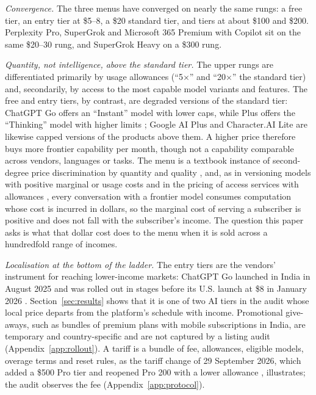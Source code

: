 \documentclass[11pt]{article}
\theoremstyle{definition}
\theoremstyle{remark}
\begin{document}
\emph{Convergence.} The three menus have converged on nearly the same rungs: a free tier, an entry tier at \$5--8, a \$20 standard tier, and tiers at about \$100 and \$200. Perplexity Pro, SuperGrok and Microsoft 365 Premium with Copilot sit on the same \$20--30 rung, and SuperGrok Heavy on a \$300 rung.

\emph{Quantity, not intelligence, above the standard tier.} The upper rungs are differentiated primarily by usage allowances (``5$\times$'' and ``20$\times$'' the standard tier) and, secondarily, by access to the most capable model variants and features. The free and entry tiers, by contrast, are degraded versions of the standard tier: ChatGPT Go offers an ``Instant'' model with lower caps, while Plus offers the ``Thinking'' model with higher limits \citep{openai2026go}; Google AI Plus and Character.AI Lite are likewise capped versions of the products above them. A higher price therefore buys more frontier capability per month, though not a capability comparable across vendors, languages or tasks. The menu is a textbook instance of second-degree price discrimination by quantity and quality \citep{mussa1978monopoly,varian1985price}, and, as in versioning models with positive marginal or usage costs \citep{jones2011information,chellappa2018cost} and in the pricing of access services with allowances \citep{essegaier2002pricing}, every conversation with a frontier model consumes computation whose cost is incurred in dollars, so the marginal cost of serving a subscriber is positive and does not fall with the subscriber's income. The question this paper asks is what that dollar cost does to the menu when it is sold across a hundredfold range of incomes.

\emph{Localisation at the bottom of the ladder.} The entry tiers are the vendors' instrument for reaching lower-income markets: ChatGPT Go launched in India in August 2025 and was rolled out in stages before its U.S. launch at \$8 in January 2026 \citep{openai2026go}. Section~\ref{sec:results} shows that it is one of two AI tiers in the audit whose local price departs from the platform's schedule with income. Promotional give-aways, such as bundles of premium plans with mobile subscriptions in India, are temporary and country-specific and are not captured by a listing audit (Appendix~\ref{app:rollout}). A tariff is a bundle of fee, allowances, eligible models, overage terms and reset rules, as the tariff change of 29 September 2026, which added a \$500 Pro tier and reopened Pro 200 with a lower allowance \citep{openai2026releasenotes,openai2026prorevision}, illustrates; the audit observes the fee (Appendix~\ref{app:protocol}).
\end{document}

